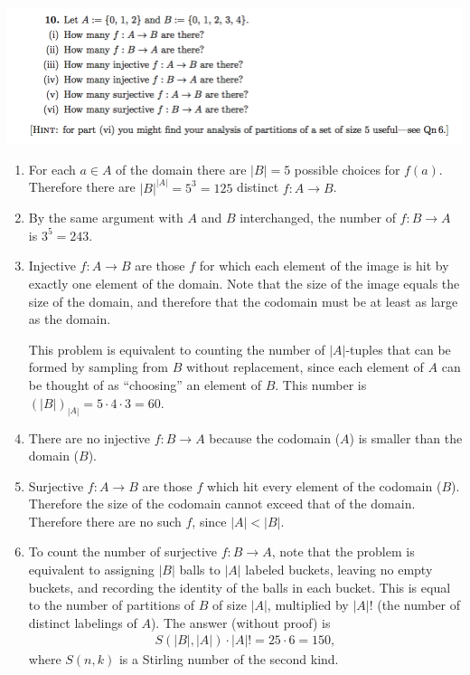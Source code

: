 \documentclass[12pt]{article}
\begin{document}
\newpage
\subsection*{} %
\includegraphics[width=500pt]{img/iulm-1-10.png}
\begin{mdframed}
\begin{enumerate}[label=(\roman*)]

\item For each $a \in A$ of the domain there are $|B| = 5$ possible choices for
  $f(a)$. Therefore there are $|B|^{|A|} = 5^3 = 125$ distinct $f:A \to B$.
\item By the same argument with $A$ and $B$ interchanged, the number of
  $f: B \to A$ is $3^5 = 243$.

\item Injective $f:A \to B$ are those $f$ for which each element of the image
  is hit by exactly one element of the domain. Note that the size of the image
  equals the size of the domain, and therefore that the codomain must be at
  least as large as the domain.

  This problem is equivalent to counting the number of $|A|$-tuples that can be
  formed by sampling from $B$ without replacement, since each element of $A$
  can be thought of as ``choosing'' an element of $B$. This number is
  $(|B|)_{|A|} = 5 \cdot 4 \cdot 3 = 60$.

\item There are no injective $f:B \to A$ because the codomain ($A$) is smaller
  than the domain ($B$).

\item Surjective $f:A \to B$ are those $f$ which hit every element of the
  codomain ($B$). Therefore the size of the codomain cannot exceed that of the
  domain. Therefore there are no such $f$, since $|A| < |B|$.

\item To count the number of surjective $f:B \to A$, note that the problem is
  equivalent to assigning $|B|$ balls to $|A|$ labeled buckets, leaving no
  empty buckets, and recording the identity of the balls in each bucket. This
  is equal to the number of partitions of $B$ of size $|A|$, multiplied by
  $|A|!$ (the number of distinct labelings of $A$). The answer (without
  proof) is
  \begin{align*}
    S(|B|, |A|) \cdot |A|! = 25 \cdot 6 = 150,
  \end{align*}
  where $S(n, k)$ is a Stirling number of the second kind.


\end{enumerate}
\end{mdframed}
\end{document}
